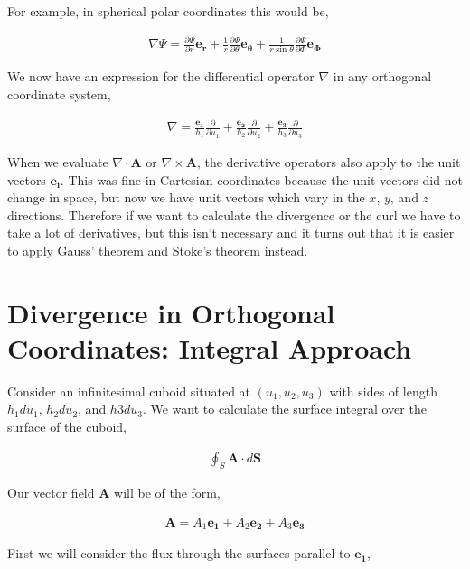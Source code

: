 \documentclass[11pt]{amsart}
\begin{document}
For example, in spherical polar coordinates this would be,

\begin{align*}
  \nabla\Psi = \frac{\partial\Psi}{\partial r} \mathbf{e_r} + \frac{1}{r}\frac{\partial\Psi}{\partial\theta}\mathbf{e_{\theta}} + \frac{1}{r\sin\theta}\frac{\partial\Psi}{\partial\Phi}\mathbf{e_{\Phi}}
\end{align*}

We now have an expression for the differential operator $\nabla$ in any orthogonal coordinate system,

\begin{align*}
  \nabla = \frac{\mathbf{e_1}}{h_1}\frac{\partial}{\partial u_1} + \frac{\mathbf{e_2}}{h_2}\frac{\partial}{\partial u_2} + \frac{\mathbf{e_3}}{h_3}\frac{\partial}{\partial u_3}
\end{align*}

When we evaluate $\nabla\cdot\mathbf{A}$ or $\nabla\times\mathbf{A}$, the derivative operators also apply to the unit vectors $\mathbf{e_i}$. This was fine in Cartesian coordinates because the unit vectors did not change in space, but now we have unit vectors which vary in the $x$, $y$, and $z$ directions. Therefore if we want to calculate the divergence or the curl we have to take a lot of derivatives, but this isn't necessary and it turns out that it is easier to apply Gauss' theorem and Stoke's theorem instead.

\section{Divergence in Orthogonal Coordinates: Integral Approach}

Consider an infinitesimal cuboid situated at $(u_1, u_2, u_3)$ with sides of length $h_1 du_1$, $h_2 du_2$, and $h3 du_3$. We want to calculate the surface integral over the surface of the cuboid,

\begin{align*}
  \oint_S \mathbf{A}\cdot d\mathbf{S}
\end{align*}

Our vector field $\mathbf{A}$ will be of the form,

\begin{align*}
  \mathbf{A} = A_1 \mathbf{e_1} + A_2 \mathbf{e_2} + A_3 \mathbf{e_3}
\end{align*}

First we will consider the flux through the surfaces parallel to $\mathbf{e_1}$,
\end{document}
